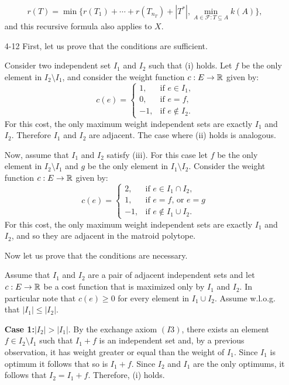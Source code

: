 \documentclass[12pt]{article}
\begin{document}
\begin{enumerate}
\begin{equation}
r(T)=\min\{r(T_1)+\cdots+r(T_{n_{T}})+|T^{*}|, \min_{A\in \mathcal{F}: T\subseteq A} k(A) \},
\end{equation}
and this recursive formula also applies to $X$. 
\fi

\iffalse
\item[4-12]
First, let us prove that the conditions are sufficient.

Consider two independent set $I_1$ and $I_2$ such that (i) holds. Let $f$ be the only element in $I_2\setminus I_1$, and consider the weight function $c: E \to {\mathbb R}$ given by:
$$c(e)= \begin{cases}
1, &\text{if $e \in I_1$,}\\
0, &\text{if $e=f$,}\\
-1, &\text{if $e \notin I_2$.}
\end{cases}$$
For this cost, the only maximum weight independent sets are exactly $I_1$ and $I_2$. Therefore $I_1$ and $I_2$ are adjacent. The case where (ii) holds is analogous.

Now, assume that $I_1$ and $I_2$ satisfy (iii). For this case let $f$ be the only element in $I_2\setminus I_1$ and $g$ be the only element in $I_1\setminus I_2$. Consider the weight function $c: E \to {\mathbb R}$ given by:
$$c(e)= \begin{cases}
2, &\text{if $e \in I_1 \cap I_2$,}\\
1, &\text{if $e=f$, or $e=g$}\\
-1, &\text{if $e \notin I_1\cup I_2$.}
\end{cases}$$
For this cost, the only maximum weight independent sets are exactly $I_1$ and $I_2$, and so they are adjacent in the matroid polytope.

Now let us prove that the conditions are necessary.
  
  Assume that $I_1$ and $I_2$ are a pair of adjacent independent sets and let $c: E \to {\mathbb R}$ be a cost function  that is maximized only by $I_1$ and $I_2$. In particular note that $c(e) \geq 0$ for every element in $I_1 \cup I_2$. Assume w.l.o.g. that $|I_1| \leq |I_2|$.

\textbf{Case 1:}$|I_2| > |I_1|$. By the exchange axiom $(I3)$, there exists an element $f \in I_2\setminus I_1$ such that $I_1 + f$ is an independent set and, by a previous observation, it has weight greater or equal than the weight of $I_1$. Since $I_1$ is optimum it follows that so is $I_1 + f$. Since $I_2$ and $I_1$ are the only optimums, it follows that $I_2 = I_1 + f$. Therefore, (i) holds.


\end{enumerate}
\end{document}

